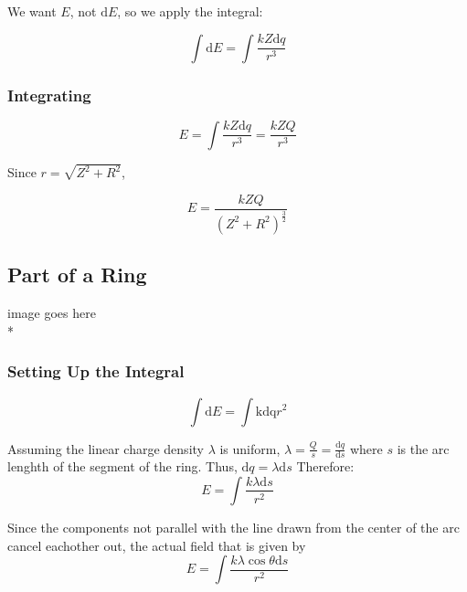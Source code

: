 \documentclass[a4paper,12pt]{article}
\begin{document}
								We want $E$, not $\mathrm{d}E$, so we apply the integral:

								\begin{equation*}
										\int \mathrm{d}E = \int \frac{kZ\mathrm{d}q}{r^{3}}
								\end{equation*}

						\subsubsection{Integrating}
								\begin{equation*}
										E = \int \frac{kZ\mathrm{d}q}{r^{3}} = \frac{kZQ}{r^{3}}
								\end{equation*}

								Since $r = \sqrt{Z^{2} + R^{2}}$, 

								\begin{equation*}
										E = \frac{kZQ}{(Z^{2} + R^{2})^{\frac{3}{2} }}
								\end{equation*}

				\subsection{Part of a Ring}
						image goes here\\*
						\subsubsection{Setting Up the Integral}
								\begin{equation*}
										\int \mathrm{d}E = \int \mathrm{k\mathrm{d}q}{r^{2}}
								\end{equation*}

								Assuming the linear charge density $\lambda$ is uniform, $\lambda = \frac{Q}{s} = \frac{\mathrm{d}{q}}{\mathrm{d}s}$ where $s$ is the arc lenghth of the segment of the ring. Thus, $\mathrm{d}q = \lambda \mathrm{d}s$ Therefore:
								\begin{equation*}
										E = \int \frac{k\lambda \mathrm{d}s}{r^{2}}
								\end{equation*}

								Since the components not parallel with the line drawn from the center of the arc cancel eachother out, the actual field that is given by 
								\begin{equation*}
										E = \int \frac{k\lambda \cos{\theta} \mathrm{d}s}{r^{2}}
								\end{equation*}
\end{document}
